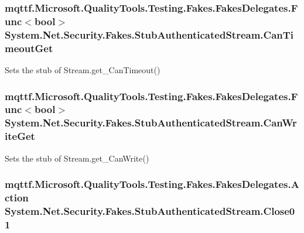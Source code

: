 \hypertarget{class_system_1_1_net_1_1_security_1_1_fakes_1_1_stub_authenticated_stream_a1b2526eae471fac423b0af1a1d70055a}{
\subsubsection[{Can\-Timeout\-Get}]{\setlength{\rightskip}{0pt plus 5cm}mqttf.\-Microsoft.\-Quality\-Tools.\-Testing.\-Fakes.\-Fakes\-Delegates.\-Func$<$bool$>$ System.\-Net.\-Security.\-Fakes.\-Stub\-Authenticated\-Stream.\-Can\-Timeout\-Get}}\label{class_system_1_1_net_1_1_security_1_1_fakes_1_1_stub_authenticated_stream_a1b2526eae471fac423b0af1a1d70055a}


Sets the stub of Stream.\-get\-\_\-\-Can\-Timeout()

\hypertarget{class_system_1_1_net_1_1_security_1_1_fakes_1_1_stub_authenticated_stream_ab0d6fd5e85f2a8e73c8568deaf5a1502}{
\subsubsection[{Can\-Write\-Get}]{\setlength{\rightskip}{0pt plus 5cm}mqttf.\-Microsoft.\-Quality\-Tools.\-Testing.\-Fakes.\-Fakes\-Delegates.\-Func$<$bool$>$ System.\-Net.\-Security.\-Fakes.\-Stub\-Authenticated\-Stream.\-Can\-Write\-Get}}\label{class_system_1_1_net_1_1_security_1_1_fakes_1_1_stub_authenticated_stream_ab0d6fd5e85f2a8e73c8568deaf5a1502}


Sets the stub of Stream.\-get\-\_\-\-Can\-Write()

\hypertarget{class_system_1_1_net_1_1_security_1_1_fakes_1_1_stub_authenticated_stream_a9f2107d55ddc053952655c4c0f25f6ea}{
\subsubsection[{Close01}]{\setlength{\rightskip}{0pt plus 5cm}mqttf.\-Microsoft.\-Quality\-Tools.\-Testing.\-Fakes.\-Fakes\-Delegates.\-Action System.\-Net.\-Security.\-Fakes.\-Stub\-Authenticated\-Stream.\-Close01}}\label{class_system_1_1_net_1_1_security_1_1_fakes_1_1_stub_authenticated_stream_a9f2107d55ddc053952655c4c0f25f6ea}


